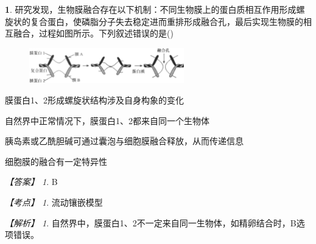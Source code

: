 \documentclass[UTF8, 10pt, a4paper, oneside]{ctexart}
\theoremstyle{definition}
\newtheorem{exercise}{}
\theoremstyle{remark}
\newtheorem*{answer}{【答案】}
\newtheorem*{point}{【考点】}      %
\newtheorem*{explanation}{【解析】}     %
\theoremstyle{plain}
\begin{document}
\begin{exercise}
    研究发现，生物膜融合存在以下机制：不同生物膜上的蛋白质相互作用形成螺旋状的复合蛋白，使磷脂分子失去稳定进而重排形成融合孔，最后实现生物膜的相互融合，过程如图所示。下列叙述错误的是\quad(\quad)
    \begin{figure}[h!]
        \centering
        \includegraphics[width=0.6\textwidth]{assists/12-1.jpg}
    \end{figure}
    \begin{adjustwidth}{2em}{}
        \begin{asparaenum}[A. ]
            \item 膜蛋白1、2形成螺旋状结构涉及自身构象的变化
            \item 自然界中正常情况下，膜蛋白1、2都来自同一个生物体
            \item 胰岛素或乙酰胆碱可通过囊泡与细胞膜融合释放，从而传递信息
            \item 细胞膜的融合有一定特异性
        \end{asparaenum}
    \end{adjustwidth}
    \begin{answer}
        B
    \end{answer}
    \begin{point}
        流动镶嵌模型
    \end{point}
    \begin{explanation}
        自然界中，膜蛋白1、2不一定来自同一生物体，如精卵结合时，B选项错误。
    \end{explanation}
\end{exercise}
\end{document}

